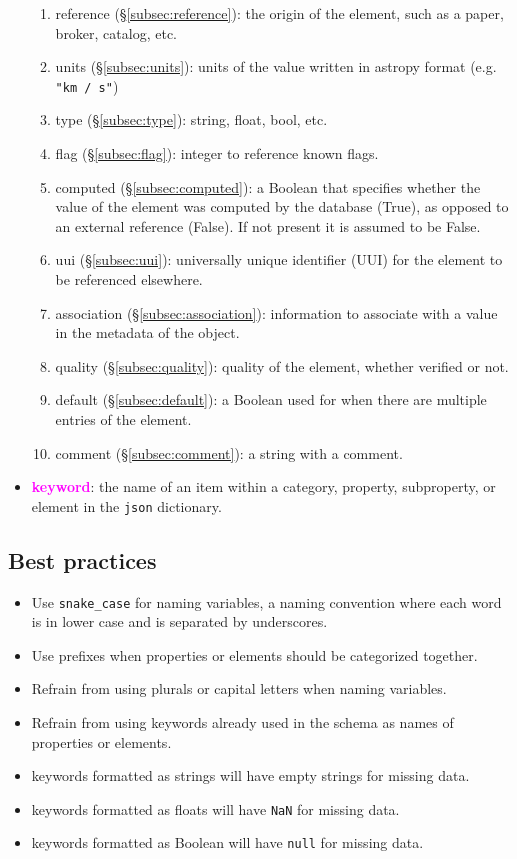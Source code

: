 \documentclass[tighten]{aastex631}
\newcommand{\keyword}[1]{\textcolor{magenta}{#1}}
\begin{document}
\begin{itemize}
\begin{enumerate}
        \item reference (\S\ref{subsec:reference}): the origin of the element, such as a paper, broker, catalog, etc.
        \item units (\S\ref{subsec:units}): units of the value written in astropy format (e.g. {\tt "km / s"})
        \item type (\S\ref{subsec:type}): string, float, bool, etc.
        \item flag (\S\ref{subsec:flag}): integer to reference known flags.
        \item computed (\S\ref{subsec:computed}): a Boolean that specifies whether the value of the element was computed by the database (True), as opposed to an external reference (False). If not present it is assumed to be False.
        \item uui (\S\ref{subsec:uui}): universally unique identifier (UUI) for the element to be referenced elsewhere.
        \item association (\S\ref{subsec:association}): information to associate with a value in the metadata of the object.
        \item quality (\S\ref{subsec:quality}): quality of the element, whether verified or not.
        \item default (\S\ref{subsec:default}): a Boolean used for when there are multiple entries of the element.
        \item comment (\S\ref{subsec:comment}): a string with a comment.
    \end{enumerate}
    \item \textbf{\keyword{keyword}}: the name of an item within a category, property, subproperty, or element in the {\tt json} dictionary.
\end{itemize}

\subsection{Best practices} \label{sec:practices}

\begin{itemize}
    \item Use {\tt snake\_case} for naming variables, a naming convention where each word is in lower case and is separated by underscores.
    \item Use prefixes when properties or elements should be categorized together.
    \item Refrain from using plurals or capital letters when naming variables.
    \item Refrain from using keywords already used in the schema as names of properties or elements.
    \item keywords formatted as strings will have empty strings for missing data.
    \item keywords formatted as floats will have {\tt NaN} for missing data.
    \item keywords formatted as Boolean will have {\tt null} for missing data.
\end{itemize}
\end{document}
